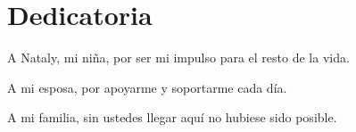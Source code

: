 \section*{\large Dedicatoria}


A Nataly, mi niña, por ser mi impulso para el resto de la vida.

A mi esposa, por apoyarme y soportarme cada día.

A mi familia, sin ustedes llegar aquí no hubiese sido posible.

\begin{center}
 	\bf{\autorUNO}
\end{center}
